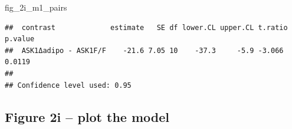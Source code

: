 \documentclass[]{book}
\newenvironment{Shaded}{\begin{snugshade}}{\end{snugshade}}
\newcommand{\DataTypeTok}[1]{\textcolor[rgb]{0.13,0.29,0.53}{#1}}
\newcommand{\KeywordTok}[1]{\textcolor[rgb]{0.13,0.29,0.53}{\textbf{#1}}}
\newcommand{\NormalTok}[1]{#1}
\newcommand{\OperatorTok}[1]{\textcolor[rgb]{0.81,0.36,0.00}{\textbf{#1}}}
\newcommand{\OtherTok}[1]{\textcolor[rgb]{0.56,0.35,0.01}{#1}}
\newcommand{\StringTok}[1]{\textcolor[rgb]{0.31,0.60,0.02}{#1}}
\begin{document}
\begin{Shaded}
\end{Shaded}

\begin{Shaded}
\begin{Highlighting}[]
\NormalTok{fig_2i_m1_pairs}
\end{Highlighting}
\end{Shaded}

\begin{verbatim}
##  contrast             estimate   SE df lower.CL upper.CL t.ratio p.value
##  ASK1Δadipo - ASK1F/F    -21.6 7.05 10    -37.3     -5.9 -3.066  0.0119 
## 
## Confidence level used: 0.95
\end{verbatim}

\hypertarget{figure-2i-plot-the-model}{%
\subsection{Figure 2i -- plot the model}\label{figure-2i-plot-the-model}}
\end{document}
